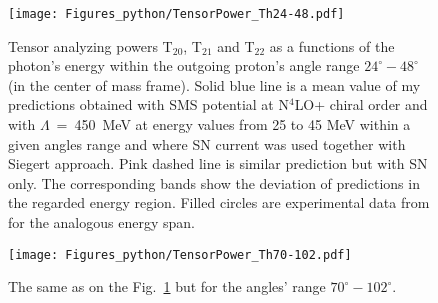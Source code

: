     \begin{figure}[h]
        \begin{center}
        \texttt{[image: Figures\_python/TensorPower\_Th24-48.pdf]}
        \end{center}
        \caption{Tensor analyzing powers T$_{20}$, T$_{21}$ and T$_{22}$ as a functions of the
        photon's energy within the outgoing proton's angle range $24^{\circ} - 48^{\circ}$
        (in the center of mass frame).
        Solid blue line is a mean value of my predictions obtained with
        SMS potential at N$^4$LO+ chiral order and with $\Lambda$~=~450~MeV
        at energy values from 25 to 45 MeV within
        a given angles range and
        where SN current was used together with Siegert approach. 
        Pink dashed line is similar prediction but with SN only. 
        The corresponding bands show the deviation of predictions in the regarded
        energy region.
        Filled circles are experimental data
        from \cite{rachek2007} for the analogous energy span.}
        \label{tensor_energy_24-48}
    \end{figure}

    \begin{figure}[h]
        \begin{center}
        \texttt{[image: Figures\_python/TensorPower\_Th70-102.pdf]}
        \end{center}
        \caption{The same as on the Fig.~\ref*{tensor_energy_24-48} but
        for the angles' range $70^{\circ} - 102^{\circ}$.}
        \label{tensor_energy_70-102}
    \end{figure}
        
